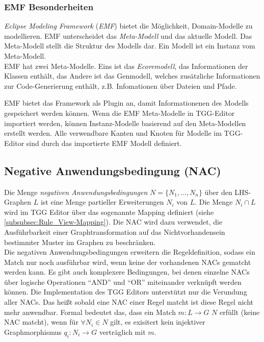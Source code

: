 \subsubsection{EMF Besonderheiten}
\emph{Eclipse Modeling Framework} (\emph{EMF}) bietet die Möglichkeit, Domain-Modelle zu modellieren. EMF unterscheidet das \emph{Meta-Modell} und das aktuelle Modell. Das Meta-Modell stellt die Struktur des Modells dar. Ein Modell ist ein Instanz vom Meta-Modell.\\
EMF hat zwei Meta-Modelle. Eins ist das \emph{Ecoremodell}, das Informationen der Klassen enthält, das Andere ist das Genmodell, welches zusätzliche Informationen zur Code-Generierung enthält, z.B. Infomationen über Dateien und Pfade.

EMF bietet das Framework als Plugin an, damit Informationenen des Modells gespeichert werden können. Wenn die EMF Meta-Modelle in TGG-Editor importiert werden, können Instanz-Modelle basierend auf den Meta-Modellen erstellt werden. 
Alle verwendbare Kanten und Knoten für Modelle im TGG-Editor sind durch das importierte EMF Modell definiert.

\subsection{Negative Anwendungsbedingung (NAC)}\label{subsec:NegativeAnwendungsbedingung}
Die Menge \emph{negativen Anwendungsbedingungen} $N = \lbrace N_1, ..., N_n\rbrace$ über den LHS-Graphen $L$ ist eine Menge partieller Erweiterungen $N_i$ von $L$. Die Menge $N_i \cap L$ wird im TGG Editor über das sogenannte Mapping definiert (siehe \ref{subsubsec:Rule_View-Mapping}). 
Die NAC wird dazu verwendet, die Ausführbarkeit einer Graphtransformation auf das Nichtvorhandensein bestimmter Muster im Graphen zu beschränken. \\
Die negativen Anwendungsbedingungen erweitern die Regeldefinition, sodass ein Match nur noch ausführbar wird, wenn keine der vorhandenen NACs gematcht werden kann. Es gibt auch komplexere Bedingungen, bei denen einzelne NACs über logische Operationen "`AND"' und "`OR"' miteinander verknüpft werden können. Die Implementation des TGG Editors unterstützt nur die Verundung aller NACs. Das heißt sobald eine NAC einer Regel matcht ist diese Regel nicht mehr anwendbar. Formal bedeutet das, dass ein Match $m: L \rightarrow G$  $N$ erfüllt (keine NAC matcht), wenn für $\forall N_i \in N$ gilt, es exisitert kein injektiver Graphmorphismus $q_i:N_i \rightarrow G$ verträglich mit $m$.

